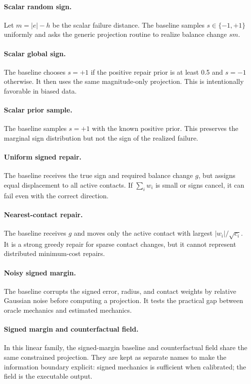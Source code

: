 \documentclass{article}
\begin{document}
\paragraph{Scalar random sign.}
Let $m=|e|-h$ be the scalar failure distance. The baseline samples $s\in\{-1,+1\}$ uniformly and asks the generic projection routine to realize balance change $sm$.

\paragraph{Scalar global sign.}
The baseline chooses $s=+1$ if the positive repair prior is at least 0.5 and $s=-1$ otherwise. It then uses the same magnitude-only projection. This is intentionally favorable in biased data.

\paragraph{Scalar prior sample.}
The baseline samples $s=+1$ with the known positive prior. This preserves the marginal sign distribution but not the sign of the realized failure.

\paragraph{Uniform signed repair.}
The baseline receives the true sign and required balance change $g$, but assigns equal displacement to all active contacts. If $\sum_i w_i$ is small or signs cancel, it can fail even with the correct direction.

\paragraph{Nearest-contact repair.}
The baseline receives $g$ and moves only the active contact with largest $|w_i|/\sqrt{c_i}$. It is a strong greedy repair for sparse contact changes, but it cannot represent distributed minimum-cost repairs.

\paragraph{Noisy signed margin.}
The baseline corrupts the signed error, radius, and contact weights by relative Gaussian noise before computing a projection. It tests the practical gap between oracle mechanics and estimated mechanics.

\paragraph{Signed margin and counterfactual field.}
In this linear family, the signed-margin baseline and counterfactual field share the same constrained projection. They are kept as separate names to make the information boundary explicit: signed mechanics is sufficient when calibrated; the field is the executable output.
\end{document}
